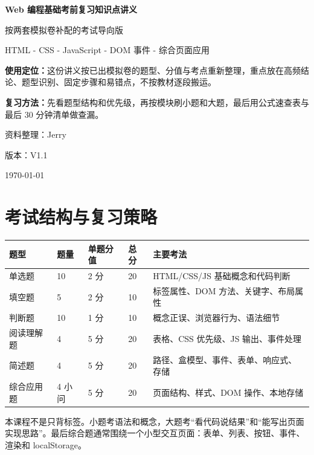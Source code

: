 \documentclass[UTF8,zihao=-4]{ctexart}
\begin{document}
\begin{titlepage}
\centering
\vspace*{2.3cm}
{\Huge\bfseries\sffamily Web 编程基础考前复习知识点讲义\par}
\vspace{0.75cm}
{\Large 按两套模拟卷补配的考试导向版\par}
\vspace{0.45cm}
{\large HTML - CSS - JavaScript - DOM 事件 - 综合页面应用\par}
\vfill
\begin{tcolorbox}[colback=lightblue,colframe=mainblue,width=0.86\textwidth,arc=2mm]
\textbf{使用定位：}这份讲义按已出模拟卷的题型、分值与考点重新整理，重点放在高频结论、题型识别、固定步骤和易错点，不按教材逐段搬运。\par
\textbf{复习方法：}先看题型结构和优先级，再按模块刷小题和大题，最后用公式速查表与最后 30 分钟清单做查漏。
\end{tcolorbox}
\vfill
{\large 资料整理：Jerry\par}
{\large 版本：V1.1\par}
{\large \today\par}
\end{titlepage}
\tableofcontents
\newpage

\section{考试结构与复习策略}

\begin{longtable}{p{}p{}p{}p{}p{}}
\toprule
\textbf{题型} & \textbf{题量} & \textbf{单题分值} & \textbf{总分} & \textbf{主要考法} \\
\midrule
单选题 & 10 & 2 分 & 20 & HTML/CSS/JS 基础概念和代码判断 \\
填空题 & 5 & 2 分 & 10 & 标签属性、DOM 方法、关键字、布局属性 \\
判断题 & 10 & 1 分 & 10 & 概念正误、浏览器行为、语法细节 \\
阅读理解题 & 4 & 5 分 & 20 & 表格、CSS 优先级、JS 输出、事件处理 \\
简述题 & 4 & 5 分 & 20 & 路径、盒模型、事件、表单、响应式、存储 \\
综合应用题 & 4 小问 & 5 分 & 20 & 页面结构、样式、DOM 操作、本地存储 \\
\bottomrule
\end{longtable}

\begin{keybox}[复习定位]
本课程不是只背标签。小题考语法和概念，大题考“看代码说结果”和“能写出页面实现思路”。最后综合题通常围绕一个小型交互页面：表单、列表、按钮、事件、渲染和 localStorage。
\end{keybox}
\end{document}
